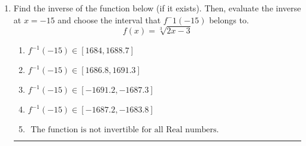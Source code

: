 \documentclass[14pt]{extbook}
\newcommand{\litem}[1]{\item#1\hspace*{-1cm}\rule{\textwidth}{0.4pt}}
\begin{document}
\begin{enumerate}
{\begin{enumerate}[label=\Alph*.]
\end{enumerate} }
\litem{
Find the inverse of the function below (if it exists). Then, evaluate the inverse at $x = -15$ and choose the interval that $f^-1(-15)$ belongs to.\[ f(x) = \sqrt[3]{2 x - 3} \]\begin{enumerate}[label=\Alph*.]
\item \( f^{-1}(-15) \in [1684, 1688.7] \)
\item \( f^{-1}(-15) \in [1686.8, 1691.3] \)
\item \( f^{-1}(-15) \in [-1691.2, -1687.3] \)
\item \( f^{-1}(-15) \in [-1687.2, -1683.8] \)
\item \( \text{ The function is not invertible for all Real numbers. } \)

\end{enumerate} }
\end{enumerate}
\end{document}
